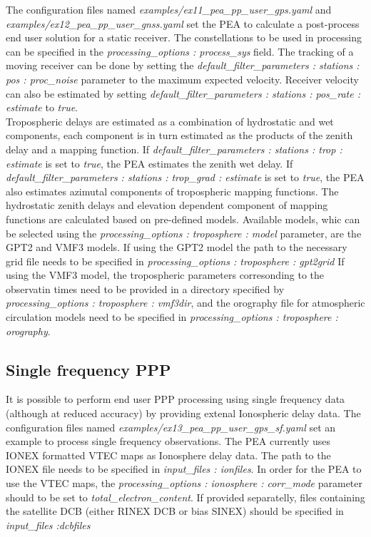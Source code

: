 The configuration files named \textit{examples/ex11\_pea\_pp\_user\_gps.yaml} and \textit{examples/ex12\_pea\_pp\_user\_gnss.yaml} set the PEA to calculate a post-process end user solution for a static receiver. 
The constellations to be used in processing can be specified in the \textit{processing\_options : process\_sys} field.
The tracking of a moving receiver can be done by setting the \textit{default\_filter\_parameters : stations : pos : proc\_noise} parameter to the maximum expected velocity.
Receiver velocity can also be estimated by setting  \textit{default\_filter\_parameters : stations : pos\_rate : estimate} to \textit{true}.\\

Tropospheric delays are estimated as a combination of hydrostatic and wet components, each component is in turn estimated as the products of the zenith delay and a mapping function.
 If \textit{default\_filter\_parameters : stations : trop : estimate} is set to \textit{true}, the PEA estimates the zenith wet delay.
 If \textit{default\_filter\_parameters : stations : trop\_grad : estimate} is set to \textit{true}, the PEA also estimates azimutal components of tropospheric mapping functions.
The hydrostatic zenith delays and elevation dependent component of mapping functions are calculated based on pre-defined models.
Available models, whic can be selected using the \textit{processing\_options : troposphere : model} parameter, are the GPT2 and VMF3 models.
If using the GPT2 model the path to the necessary grid file needs to be specified in  \textit{processing\_options : troposphere : gpt2grid}
If using the VMF3 model, the tropospheric parameters corresonding to the observatin times need to be provided in a directory specified by \textit{processing\_options : troposphere : vmf3dir}, and the orography file for atmospheric circulation models need to be specified in \textit{processing\_options : troposphere : orography}.\\
 
\subsection{Single frequency PPP}
It is possible to perform end user PPP processing using single frequency data (although at reduced accuracy) by providing extenal Ionospheric delay data.
The configuration files named \textit{examples/ex13\_pea\_pp\_user\_gps\_sf.yaml} set an example to process single frequency observations.
The PEA currently uses IONEX formatted VTEC maps as Ionosphere delay data. 
The path to the IONEX file needs to be specified  in  \textit{input\_files : ionfiles}.
In order for the PEA to use the VTEC maps, the \textit{processing\_options : ionosphere : corr\_mode} parameter should to be set to \textit{total\_electron\_content}.
If provided separatelly, files containing the satellite DCB (either RINEX DCB or bias SINEX) should be specified in \textit{input\_files :dcbfiles} \\

